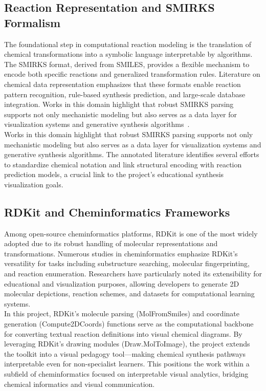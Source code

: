 \documentclass[12pt]{article}
\begin{document}
\subsection{Reaction Representation and SMIRKS Formalism}
\indent
The foundational step in computational reaction modeling is the translation of chemical transformations into a symbolic language interpretable by algorithms.
The SMIRKS format, derived from SMILES, provides a flexible mechanism to encode both specific reactions and generalized transformation rules.
Literature on chemical data representation emphasizes that these formats enable reaction pattern recognition, rule-based synthesis prediction, and large-scale database integration.
Works in this domain highlight that robust SMIRKS parsing supports not only mechanistic modeling but also serves as a data layer for visualization systems and generative synthesis algorithms~\cite{10.1002/ail2.91}.
\\
\indent
Works in this domain highlight that robust SMIRKS parsing supports not only mechanistic modeling but also serves as a data layer for visualization systems and generative synthesis algorithms.
The annotated literature identifies several efforts to standardize chemical notation and link structural encoding with reaction prediction models, a crucial link to the project’s educational synthesis visualization goals.
\subsection{RDKit and Cheminformatics Frameworks}
\indent
Among open-source cheminformatics platforms, RDKit is one of the most widely adopted due to its robust handling of molecular representations and transformations. 
Numerous studies in cheminformatics emphasize RDKit’s versatility for tasks including substructure searching, molecular fingerprinting, and reaction enumeration.
Researchers have particularly noted its extensibility for educational and visualization purposes, allowing developers to generate 2D molecular depictions, reaction schemes, and datasets for computational learning systems.
\\
\indent
In this project, RDKit’s molecule parsing (MolFromSmiles) and coordinate generation (Compute2DCoords) functions serve as the computational backbone for converting textual reaction definitions into visual chemical diagrams.
By leveraging RDKit’s drawing modules (Draw.MolToImage), the project extends the toolkit into a visual pedagogy tool—making chemical synthesis pathways interpretable even for non-specialist learners.
This positions the work within a subfield of cheminformatics focused on interpretable visual analytics, bridging chemical informatics and visual communication.
\\
\end{document}
